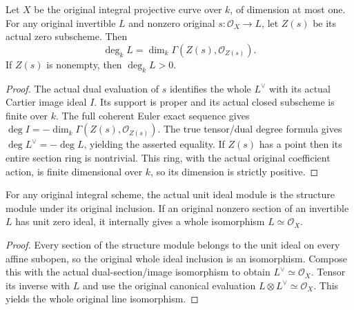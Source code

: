\begin{lemma}
\label{lem:fc-original-zero-section-degree-dimension}
\leanok
{}
Let $X$ be the original integral projective curve over $k$, of dimension
at most one.  For any original invertible $L$ and nonzero original
$s:\mathcal O_X\to L$, let $Z(s)$ be its actual zero subscheme.  Then
\[
 \deg_k L=\dim_k\Gamma(Z(s),\mathcal O_{Z(s)}).
\]
If $Z(s)$ is nonempty, then $\deg_k L>0$.
\end{lemma}
\begin{proof}
The actual dual evaluation of $s$ identifies the whole $L^\vee$ with its
actual Cartier image ideal $I$.  Its support is proper and its actual
closed subscheme is finite over $k$.  The full coherent Euler exact
sequence gives $\deg I=-\dim_k\Gamma(Z(s),\mathcal O_{Z(s)})$.
The true tensor/dual degree formula gives $\deg L^\vee=-\deg L$,
yielding the asserted equality.  If $Z(s)$ has a point then its entire
section ring is nontrivial.  This ring, with the actual original
coefficient action, is finite dimensional over $k$, so its dimension is
strictly positive.
\end{proof}

\begin{lemma}
\label{lem:fc-original-zero-section-whole-trivialization}
\leanok
{}
For any original integral scheme, the actual unit ideal module is the
structure module under its original inclusion.  If an original nonzero
section of an invertible $L$ has unit zero ideal, it internally gives a
whole isomorphism $L\simeq\mathcal O_X$.
\end{lemma}
\begin{proof}
Every section of the structure module belongs to the unit ideal on every
affine subopen, so the original whole ideal inclusion is an isomorphism.
Compose this with the actual dual-section/image isomorphism to obtain
$L^\vee\simeq\mathcal O_X$.  Tensor its inverse with $L$ and use the
original canonical evaluation $L\otimes L^\vee\simeq\mathcal O_X$.
This yields the whole original line isomorphism.
\end{proof}

